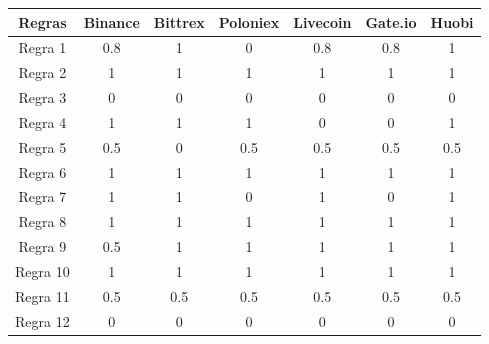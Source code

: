 \begin{table}[h]
    \centering
    \begin{tabular}{|c|c|c|c|c|c|c|}
        \hline
        \textbf{Regras} & \textbf{Binance} & \textbf{Bittrex} & \textbf{Poloniex} & \textbf{Livecoin} & \textbf{Gate.io} & \textbf{Huobi} \\ \hline
        Regra 1         & 0.8              & 1                & 0                 & 0.8               & 0.8              & 1              \\ \hline
        Regra 2         & 1                & 1                & 1                 & 1                 & 1                & 1              \\ \hline
        Regra 3         & 0                & 0                & 0                 & 0                 & 0                & 0              \\ \hline
        Regra 4         & 1                & 1                & 1                 & 0                 & 0                & 1              \\ \hline
        Regra 5         & 0.5              & 0                & 0.5               & 0.5               & 0.5              & 0.5            \\ \hline
        Regra 6         & 1                & 1                & 1                 & 1                 & 1                & 1              \\ \hline
        Regra 7         & 1                & 1                & 0                 & 1                 & 0                & 1              \\ \hline
        Regra 8         & 1                & 1                & 1                 & 1                 & 1                & 1              \\ \hline
        Regra 9         & 0.5              & 1                & 1                 & 1                 & 1                & 1              \\ \hline
        Regra 10        & 1                & 1                & 1                 & 1                 & 1                & 1              \\ \hline
        Regra 11        & 0.5              & 0.5              & 0.5               & 0.5               & 0.5              & 0.5            \\ \hline
        Regra 12        & 0                & 0                & 0                 & 0                 & 0                & 0              \\ \hline

\end{tabular}
\end{table}
